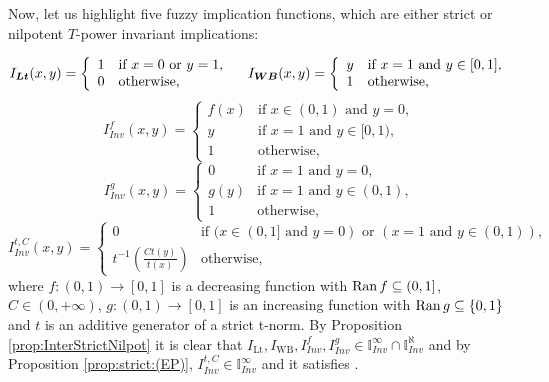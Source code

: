 
Now, let us highlight five fuzzy implication functions, which are either strict or nilpotent $T$-power invariant implications:

$$
I_{\bm{Lt}}(x,y)
=
\left\{ \begin{array}{ll}
	1 &   \text{if }   x=0 \text{ or } y=1, \\
	0 & \text{otherwise,}
\end{array}
\right. \quad
I_{\bm{WB}}(x,y) =\left\{ \begin{array}{ll}
	y &  \text{if }  x = 1 \text{ and } y\in [0,1], \\
	1 &  \text{otherwise,}
\end{array}
\right.
$$
$$
I_{Inv}^{f}(x,y)
=
\left\{ \begin{array}{ll}
	f(x) &   \text{if }   x \in (0,1) \text{ and } y=0, \\
	y &   \text{if }   x=1 \text{ and } y \in [0,1), \\
	1 & \text{otherwise,}
\end{array}
\right.
$$
$$
I_{Inv}^{g}(x,y)
=
\left\{ \begin{array}{ll}
	0 &   \text{if }   x=1 \text{ and } y=0, \\
	g(y) &   \text{if }   x=1 \text{ and } y \in(0,1), \\
	1 & \text{otherwise,}
\end{array}
\right.
$$
$$
I_{Inv}^{t,C}(x,y)
=
\left\{ \begin{array}{ll}
	0 &   \text{if }   (x \in (0,1] \text{ and } y=0) \text{ or } (x=1 \text{ and } y \in (0,1)), \\
	t^{-1}\left(\frac{Ct(y)}{t(x)}\right) & \text{otherwise},
\end{array}
\right.
$$
where $f:(0,1) \to [0,1]$ is a decreasing function with $\operatorname{Ran} f \subseteq (0,1]$, $C \in (0,+\infty)$, $g:(0,1) \to [0,1]$ is an increasing function with $\operatorname{Ran} g \subseteq \{0,1\}$ and $t$ is an additive generator of a strict t-norm. By Proposition \ref{prop:InterStrictNilpot} it is clear that $I_{\text{Lt}}, I_{\text{WB}}, I_{Inv}^{f}, I_{Inv}^{g} \in \mathbb{I}^{\infty}_{Inv} \cap \mathbb{I}^{\aleph}_{Inv}$ and by Proposition \ref{prop:strict:(EP)}, $I_{Inv}^{t,C} \in \mathbb{I}^{\infty}_{Inv}$ and it satisfies \EP.

